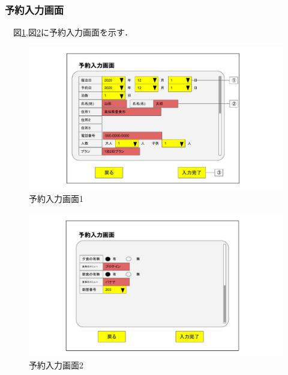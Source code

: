 \subsubsection{予約入力画面}
　図\ref{fig:frontR1},図\ref{fig:frontR2}に予約入力画面を示す．

\begin{figure}[H]
 \centering
   \includegraphics[width=150mm]{UI_front/Input-Reservation-screen.pdf}
 \caption{予約入力画面1}
 \label{fig:frontR1}
\end{figure}
\begin{figure}[H]
 \centering
   \includegraphics[width=150mm]{UI_front/Input-Reservation-screen02.pdf}
 \caption{予約入力画面2}
 \label{fig:frontR2}
\end{figure}


